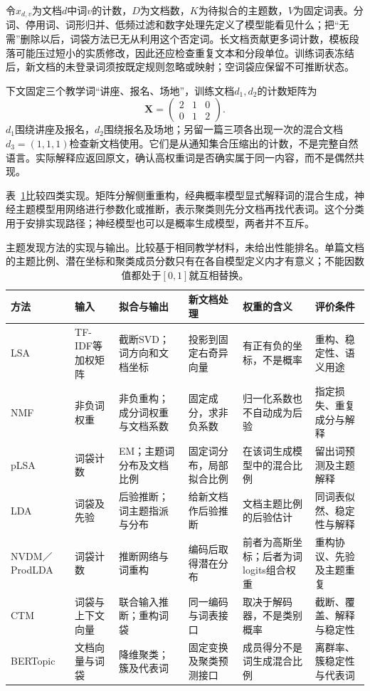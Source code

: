 令$x_{d,v}$为文档$d$中词$v$的计数，$D$为文档数，$K$为待拟合的主题数，$V$为固定词表。分词、停用词、词形归并、低频过滤和数字处理先定义了模型能看见什么；把“无需”删除以后，词袋方法已无从利用这个否定词。长文档贡献更多词计数，模板段落可能压过短小的实质修改，因此还应检查重复文本和分段单位。训练词表冻结后，新文档的未登录词须按既定规则忽略或映射；空词袋应保留不可推断状态。

下文固定三个教学词“讲座、报名、场地”，训练文档$d_1,d_2$的计数矩阵为
\begin{equation}
 \label{eq:nlp-classification-topic-counts}
 \bm X=
 \begin{pmatrix}2&1&0\\0&1&2\end{pmatrix}.
\end{equation}
$d_1$围绕讲座及报名，$d_2$围绕报名及场地；另留一篇三项各出现一次的混合文档$d_3=(1,1,1)$检查新文档使用。它们是从通知集合压缩出的计数，不是完整自然语言。实际解释应返回原文，确认高权重词是否确实属于同一内容，而不是偶然共现。

表~\ref{tab:nlp-classification-topic-methods}比较四类实现。矩阵分解侧重重构，经典概率模型显式解释词的混合生成，神经主题模型用网络进行参数化或推断，表示聚类则先分文档再找代表词。这个分类用于安排实现路径；神经模型也可以是概率生成模型，两者并不互斥。

\begin{table}[htbp]
 \centering
 \begin{tabularx}{\linewidth}{@{}p{15mm}p{19mm}Xp{25mm}Xp{23mm}@{}}
  \toprule
  方法 & 输入 & 拟合与输出 & 新文档处理 & 权重的含义 & 评价条件 \\
  \midrule
  LSA & TF-IDF等加权矩阵 & 截断SVD；词方向和文档坐标 & 投影到固定右奇异向量 & 有正有负的坐标，不是概率 & 重构、稳定性、语义用途 \\
  NMF & 非负词权重 & 非负重构；成分词权重与文档系数 & 固定成分，求非负系数 & 归一化系数也不自动成为后验 & 指定损失、重复成分与解释 \\
  pLSA & 词袋计数 & EM；主题词分布及文档比例 & 固定词分布，局部拟合比例 & 在该词生成模型中的混合比例 & 留出词预测及主题解释 \\
  LDA & 词袋及先验 & 后验推断；词主题指派与分布 & 给新文档作后验推断 & 文档主题比例的后验估计 & 同词表似然、稳定性与解释 \\
  NVDM／ProdLDA & 词袋计数 & 推断网络与词重构 & 编码后取得潜在分布 & 前者为高斯坐标；后者为词logits组合权重 & 重构协议、先验及主题重复 \\
  CTM & 词袋与上下文向量 & 联合输入推断；重构词袋 & 同一编码与词表接口 & 取决于解码器，不是类别概率 & 截断、覆盖、解释与稳定性 \\
  BERTopic & 文档向量与词袋 & 降维聚类；簇及代表词 & 固定变换及聚类预测接口 & 成员得分不是词生成混合比例 & 离群率、簇稳定性与代表词 \\
  \bottomrule
 \end{tabularx}
 \caption{主题发现方法的实现与输出。比较基于相同教学材料，未给出性能排名。单篇文档的主题比例、潜在坐标和聚类成员分数只有在各自模型定义内才有意义；不能因数值都处于$[0,1]$就互相替换。}
 \label{tab:nlp-classification-topic-methods}
\end{table}

